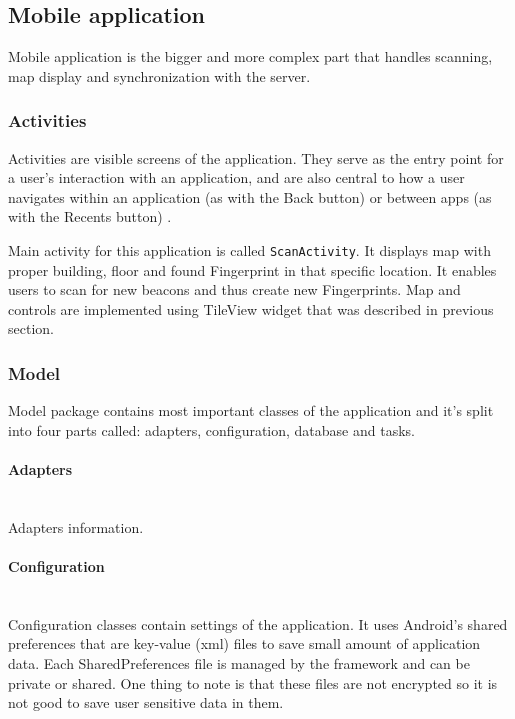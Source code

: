 \subsection{Mobile application}\label{subsec:MobileApplication}
Mobile application is the bigger and more complex part that handles scanning, map display and synchronization with the server.

\subsubsection{Activities}\label{subsec:Activities}
Activities are visible screens of the application. They serve as the entry point for a user's interaction with an application, and are also central to how a user navigates within an application (as with the Back button) or between apps (as with the Recents button) \cite{AD}.

Main activity for this application is called \verb|ScanActivity|. It displays map with proper building, floor and found Fingerprint in that specific location. It enables users to scan for new beacons and thus create new Fingerprints. Map and controls are implemented using TileView widget that was described in previous section. 

\subsubsection{Model}\label{subsec:Model}
Model package contains most important classes of the application and it's split into four parts called: adapters, configuration, database and tasks.

\paragraph{Adapters}\label{subsec:Adapters}\mbox{} \\
Adapters information. 

\paragraph{Configuration}\label{subsec:Configuration}\mbox{} \\
Configuration classes contain settings of the application. It uses Android's shared preferences that are key-value (xml) files to save small amount of application data. Each SharedPreferences file is managed by the framework and can be private or shared. One thing to note is that these files are not encrypted so it is not good to save user sensitive data in them.

